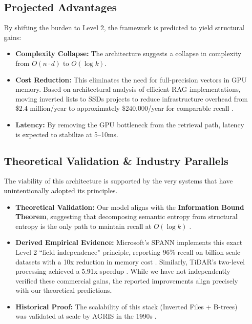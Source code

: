 \documentclass[manuscript,screen,nonacm]{acmart}
\begin{document}
\subsection{Projected Advantages}

By shifting the burden to Level 2, the framework is predicted to yield structural gains:
\begin{itemize}
    \item \textbf{Complexity Collapse:} The architecture suggests a collapse in complexity from $O(n \cdot d)$ to $O(\log k)$.
    \item \textbf{Cost Reduction:} This eliminates the need for full-precision vectors in GPU memory. Based on architectural analysis of efficient RAG implementations, moving inverted lists to SSDs projects to reduce infrastructure overhead from \$2.4 million/year to approximately \$240,000/year for comparable recall \cite{vectordb2024}.
    \item \textbf{Latency:} By removing the GPU bottleneck from the retrieval path, latency is expected to stabilize at 5--10ms.
\end{itemize}

\subsection{Theoretical Validation \& Industry Parallels}

The viability of this architecture is supported by the very systems that have unintentionally adopted its principles.
\begin{itemize}
    \item \textbf{Theoretical Validation:} Our model aligns with the \textbf{Information Bound Theorem}, suggesting that decomposing semantic entropy from structural entropy is the only path to maintain recall at $O(\log k)$ \cite{korten2025}.
    \item \textbf{Derived Empirical Evidence:} Microsoft's SPANN implements this exact Level 2 ``field independence'' principle, reporting 96\% recall on billion-scale datasets with a 10x reduction in memory cost \cite{chen2021}. Similarly, TiDAR's two-level processing achieved a 5.91x speedup \cite{liu2024}. While we have not independently verified these commercial gains, the reported improvements align precisely with our theoretical predictions.
    \item \textbf{Historical Proof:} The scalability of this stack (Inverted Files + B-trees) was validated at scale by AGRIS in the 1990s \cite{fao2005}.
\end{itemize}
\end{document}
